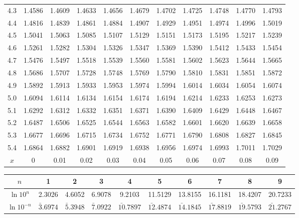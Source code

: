{\begin{tabular}{|c|cccccccccc|}
4.3 & 1.4586 & 1.4609 & 1.4633 & 1.4656 & 1.4679 & 1.4702 & 1.4725 & 1.4748 & 1.4770 & 1.4793 \\
4.4 & 1.4816 & 1.4839 & 1.4861 & 1.4884 & 1.4907 & 1.4929 & 1.4951 & 1.4974 & 1.4996 & 1.5019 \\
\hline
4.5 & 1.5041 & 1.5063 & 1.5085 & 1.5107 & 1.5129 & 1.5151 & 1.5173 & 1.5195 & 1.5217 & 1.5239 \\
4.6 & 1.5261 & 1.5282 & 1.5304 & 1.5326 & 1.5347 & 1.5369 & 1.5390 & 1.5412 & 1.5433 & 1.5454 \\
4.7 & 1.5476 & 1.5497 & 1.5518 & 1.5539 & 1.5560 & 1.5581 & 1.5602 & 1.5623 & 1.5644 & 1.5665 \\
4.8 & 1.5686 & 1.5707 & 1.5728 & 1.5748 & 1.5769 & 1.5790 & 1.5810 & 1.5831 & 1.5851 & 1.5872 \\
4.9 & 1.5892 & 1.5913 & 1.5933 & 1.5953 & 1.5974 & 1.5994 & 1.6014 & 1.6034 & 1.6054 & 1.6074 \\
\hline
5.0 & 1.6094 & 1.6114 & 1.6134 & 1.6154 & 1.6174 & 1.6194 & 1.6214 & 1.6233 & 1.6253 & 1.6273 \\
5.1 & 1.6292 & 1.6312 & 1.6332 & 1.6351 & 1.6371 & 1.6390 & 1.6409 & 1.6429 & 1.6448 & 1.6467 \\
5.2 & 1.6487 & 1.6506 & 1.6525 & 1.6544 & 1.6563 & 1.6582 & 1.6601 & 1.6620 & 1.6639 & 1.6658 \\
5.3 & 1.6677 & 1.6696 & 1.6715 & 1.6734 & 1.6752 & 1.6771 & 1.6790 & 1.6808 & 1.6827 & 1.6845 \\
5.4 & 1.6864 & 1.6882 & 1.6901 & 1.6919 & 1.6938 & 1.6956 & 1.6974 & 1.6993 & 1.7011 & 1.7029 \\
\hline
$x$ & 0 & 0.01 & 0.02 & 0.03 & 0.04 & 0.05 & 0.06 & 0.07 & 0.08 & 0.09 \\ \hline
\end{tabular}\par}

\vspace{1em}
{\centering\fontsize{8pt}{9.5pt}\selectfont\setlength{\tabcolsep}{4.5pt}\renewcommand{\arraystretch}{1.1}
\begin{tabular}{|c|ccccccccc|}
\hline
$n$ & 1 & 2 & 3 & 4 & 5 & 6 & 7 & 8 & 9 \\ \hline
$\ln 10^n$ & 2.3026 & 4.6052 & 6.9078 & 9.2103 & 11.5129 & 13.8155 & 16.1181 & 18.4207 & 20.7233 \\
$\ln 10^{-n}$ & $\bar{3}.6974$ & $\bar{5}.3948$ & $\bar{7}.0922$ & $\bar{10}.7897$ & $\bar{12}.4874$ & $\bar{14}.1845$ & $\bar{17}.8819$ & $\bar{19}.5793$ & $\bar{21}.2767$ \\ \hline
\end{tabular}\par}

